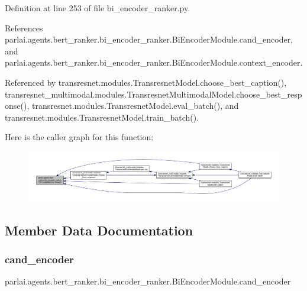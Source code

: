 Definition at line 253 of file bi\+\_\+encoder\+\_\+ranker.\+py.



References parlai.\+agents.\+bert\+\_\+ranker.\+bi\+\_\+encoder\+\_\+ranker.\+Bi\+Encoder\+Module.\+cand\+\_\+encoder, and parlai.\+agents.\+bert\+\_\+ranker.\+bi\+\_\+encoder\+\_\+ranker.\+Bi\+Encoder\+Module.\+context\+\_\+encoder.



Referenced by transresnet.\+modules.\+Transresnet\+Model.\+choose\+\_\+best\+\_\+caption(), transresnet\+\_\+multimodal.\+modules.\+Transresnet\+Multimodal\+Model.\+choose\+\_\+best\+\_\+response(), transresnet.\+modules.\+Transresnet\+Model.\+eval\+\_\+batch(), and transresnet.\+modules.\+Transresnet\+Model.\+train\+\_\+batch().

Here is the caller graph for this function\+:
\nopagebreak
\begin{figure}[H]
\begin{center}
\leavevmode
\includegraphics[width=350pt]{classparlai_1_1agents_1_1bert__ranker_1_1bi__encoder__ranker_1_1BiEncoderModule_a74b6c842e6e99d8a86f669e385ae48e9_icgraph}
\end{center}
\end{figure}


\subsection{Member Data Documentation}
\mbox{\label{classparlai_1_1agents_1_1bert__ranker_1_1bi__encoder__ranker_1_1BiEncoderModule_a719af14e2b84f3a52eec12b94ff0c35f}} 
\subsubsection{\texorpdfstring{cand\+\_\+encoder}{cand\_encoder}}
{\footnotesize\ttfamily parlai.\+agents.\+bert\+\_\+ranker.\+bi\+\_\+encoder\+\_\+ranker.\+Bi\+Encoder\+Module.\+cand\+\_\+encoder}



